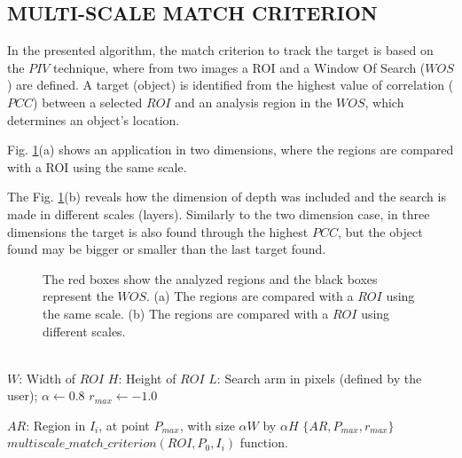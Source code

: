 
\subsection{MULTI-SCALE MATCH CRITERION}
In the presented algorithm, the match criterion to track the target is based on the $PIV$ technique, 
where from two images a ROI and a Window Of Search ($WOS$) are defined. A target (object) is identified 
from the highest value of correlation ($PCC$) between a selected $ROI$ and an analysis region in the $WOS$,
which determines an object's location.

Fig. \ref{fig:multires}(a) shows an application in two dimensions, where
the regions are compared with a ROI using the same scale.

The Fig. \ref{fig:multires}(b) reveals how the dimension of depth was included and
the search is made in different scales (layers). Similarly to the two dimension case, 
in three dimensions the target is also found through the highest $PCC$, but the object found may be 
bigger or smaller than the last target found.

\begin{figure}[H]
\centering
  \caption{The red boxes show the analyzed regions and the black boxes represent the $WOS$. 
  (a) The regions are compared with a $ROI$ using the same scale. 
  (b) The regions are compared with a $ROI$ using different scales.}
  \label{fig:multires}
\end{figure}



\begin{algorithm}[H]
 ~\\
 $W$: Width of $ROI$\;
 $H$: Height of $ROI$\;
 $L$: Search arm in pixels (defined by the user);
 $\alpha \leftarrow 0.8$\;
 $r_{max} \leftarrow -1.0$\;
 ~\\
    
$AR$: Region in $I_i$, at point $P_{max}$, with size $\alpha W$ by $\alpha H$\;      
\Return $\{AR,P_{max},r_{max}\}$\;
~\\
\caption{$multiscale\_match\_criterion(ROI,P_0,I_i)$ function.}
\label{alg:multires}
\end{algorithm}

